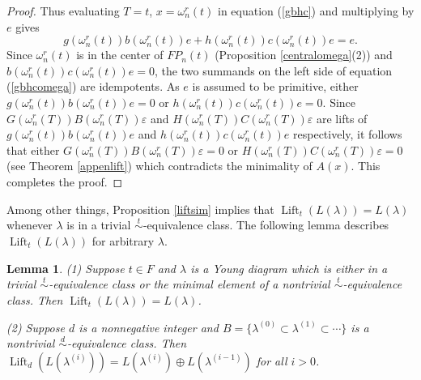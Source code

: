 \documentclass{amsart}
\newtheorem{lemma}[theorem]{Lemma}
\theoremstyle{definition}
\newcommand{\Lift}{\operatorname{Lift}}
\renewcommand{\1}{_{(1)}}
\renewcommand{\2}{_{(2)}}
\newcommand{\3}{_{(3)}}
\newcommand{\4}{_{(4)}}
\newcommand{\ep}{\varepsilon}
\begin{document}
\begin{proof}
Thus evaluating $T=t$, $x=\omega_n^r(t)$ in equation (\ref{gbhc}) and multiplying by $e$ gives \begin{equation}\label{gbhcomega}g(\omega_n^r(t))b(\omega_n^r(t))e+h(\omega_n^r(t))c(\omega_n^r(t))e=e.
\end{equation}
Since $\omega_n^r(t)$ is in the center of $FP_n(t)$ (Proposition \ref{centralomega}(2)) and $b(\omega_n^r(t))c(\omega_n^r(t))e=0$, the two summands on the left side of equation (\ref{gbhcomega}) are idempotents.  As $e$ is assumed to be primitive, either $g(\omega_n^r(t))b(\omega_n^r(t))e=0$ or $h(\omega_n^r(t))c(\omega_n^r(t))e=0$.  Since $G(\omega_n^r(T))B(\omega_n^r(T))\ep$ and $H(\omega_n^r(T))C(\omega_n^r(T))\ep$ are lifts of $g(\omega_n^r(t))b(\omega_n^r(t))e$ and $h(\omega_n^r(t))c(\omega_n^r(t))e$ respectively, it follows that 
 either $G(\omega_n^r(T))B(\omega_n^r(T))\ep=0$ or $H(\omega_n^r(T))C(\omega_n^r(T))\ep=0$ (see Theorem \ref{appenlift}) which contradicts the minimality of $A(x)$.  This completes the proof.
\end{proof}

Among other things, Proposition \ref{liftsim} implies that $\Lift_t(L(\lambda))=L(\lambda)$ whenever $\lambda$ is in a trivial $\stackrel{t}{\sim}$-equivalence class. The following lemma describes $\Lift_t(L(\lambda))$ for arbitrary $\lambda$.


\begin{lemma}\label{liftdec} (1) Suppose $t\in F$ and  $\lambda$ is a Young diagram which is either in a trivial $\stackrel{t}{\sim}$-equivalence class or the minimal element of a nontrivial $\stackrel{t}{\sim}$-equivalence class.  Then $\Lift_t(L(\lambda))=L(\lambda)$.

(2)  Suppose $d$ is a nonnegative integer and $B=\{\lambda^{(0)}\subset\lambda^{(1)}\subset\cdots\}$ is a nontrivial $\stackrel{d}{\sim}$-equivalence class.  Then $\Lift_d(L(\lambda^{(i)}))=L(\lambda^{(i)})\oplus L(\lambda^{(i-1)})$ for all $i>0$.
\end{lemma}
\end{document}
